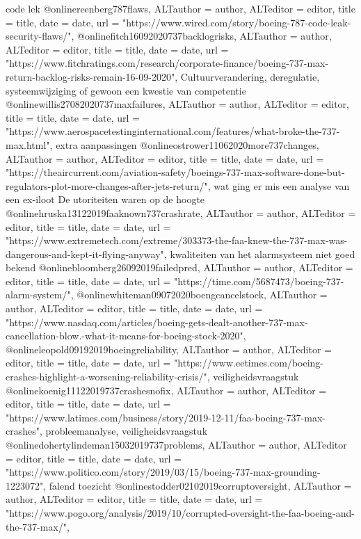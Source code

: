{{{{{{{{{{{{{{code lek
@online{reenberg787flaws,	ALTauthor = {author},	ALTeditor = {editor},	title = {title},	date = {date},	url = {"https://www.wired.com/story/boeing-787-code-leak-security-flaws/"},}
@online{fitch16092020737backlogrisks,	ALTauthor = {author},	ALTeditor = {editor},	title = {title},	date = {date},	url = {"https://www.fitchratings.com/research/corporate-finance/boeing-737-max-return-backlog-risks-remain-16-09-2020"},}
Cultuurverandering, deregulatie, systeemwijziging of gewoon een kwestie van competentie
@online{willis27082020737maxfailures,	ALTauthor = {author},	ALTeditor = {editor},	title = {title},	date = {date},	url = {"https://www.aerospacetestinginternational.com/features/what-broke-the-737-max.html"},}
extra aanpassingen
@online{ostrower11062020more737changes,	ALTauthor = {author},	ALTeditor = {editor},	title = {title},	date = {date},	url = {"https://theaircurrent.com/aviation-safety/boeings-737-max-software-done-but-regulators-plot-more-changes-after-jets-return/"},}
wat ging er mis een analyse van een ex-iloot
De utoriteiten waren op de hoogte
@online{hruska13122019faaknown737crashrate,	ALTauthor = {author},	ALTeditor = {editor},	title = {title},	date = {date},	url = {"https://www.extremetech.com/extreme/303373-the-faa-knew-the-737-max-was-dangerous-and-kept-it-flying-anyway"},}
kwaliteiten van het alarmsysteem niet goed bekend
@online{bloomberg26092019failedpred,	ALTauthor = {author},	ALTeditor = {editor},	title = {title},	date = {date},	url = {"https://time.com/5687473/boeing-737-alarm-system/"},}
@online{whiteman09072020boengcancelstock,	ALTauthor = {author},	ALTeditor = {editor},	title = {title},	date = {date},	url = {"https://www.nasdaq.com/articles/boeing-gets-dealt-another-737-max-cancellation-blow.-what-it-means-for-boeing-stock-2020"},}
@online{leopold09192019boeingreliability,	ALTauthor = {author},	ALTeditor = {editor},	title = {title},	date = {date},	url = {"https://www.eetimes.com/boeing-crashes-highlight-a-worsening-reliability-crisis/"},}
veiligheidsvraagstuk
@online{koenig11122019737crashesnofix,	ALTauthor = {author},	ALTeditor = {editor},	title = {title},	date = {date},	url = {"https://www.latimes.com/business/story/2019-12-11/faa-boeing-737-max-crashes"},}
probleemanalyse, veiligheidsvraagstuk
@online{dohertylindeman15032019737problems,	ALTauthor = {author},	ALTeditor = {editor},	title = {title},	date = {date},	url = {"https://www.politico.com/story/2019/03/15/boeing-737-max-grounding-1223072"},}
falend toezicht
@online{stodder02102019corruptoversight,	ALTauthor = {author},	ALTeditor = {editor},	title = {title},	date = {date},	url = {"https://www.pogo.org/analysis/2019/10/corrupted-oversight-the-faa-boeing-and-the-737-max/"},}
}}}}}}}}}}}}}}
